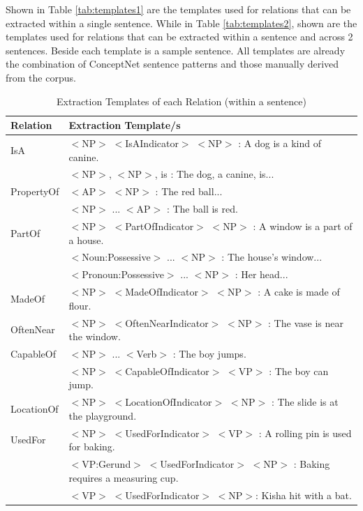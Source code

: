 Shown in Table \ref{tab:templates1} are the templates used for relations that can be extracted within a single sentence. While in Table \ref{tab:templates2}, shown are the templates used for relations that can be extracted within a sentence and across 2 sentences. Beside each template is a sample sentence. All templates are already the combination of ConceptNet sentence patterns and those manually derived from the corpus.

\begin{table}[H]   %
\centering
\caption{Extraction Templates of each Relation (within a sentence)} \vspace{0.25em}
\begin{tabular}{|p{3.5cm}|p{10cm}|} \hline
Relation & Extraction Template/s \\ \hline
IsA					& $<$NP$>$ $<$IsAIndicator$>$ $<$NP$>$ : A dog is a kind of canine. \\
					& $<$NP$>$, $<$NP$>$, is : The dog, a canine, is... \\ \hline
PropertyOf			& $<$AP$>$ $<$NP$>$ : The red ball... \\
					& $<$NP$>$ ... $<$AP$>$ : The ball is red. \\ \hline
PartOf				& $<$NP$>$ $<$PartOfIndicator$>$ $<$NP$>$ : A window is a part of a house. \\
					& $<$Noun:Possessive$>$ ... $<$NP$>$ : The house's window... \\
					& $<$Pronoun:Possessive$>$ ... $<$NP$>$ : Her head... \\ \hline
MadeOf				& $<$NP$>$ $<$MadeOfIndicator$>$ $<$NP$>$ : A cake is made of flour. \\ \hline
OftenNear			& $<$NP$>$ $<$OftenNearIndicator$>$ $<$NP$>$ : The vase is near the window. \\ \hline
CapableOf			& $<$NP$>$ ... $<$Verb$>$ : The boy jumps. \\
					& $<$NP$>$ $<$CapableOfIndicator$>$ $<$VP$>$ : The boy can jump. \\ \hline
LocationOf			& $<$NP$>$ $<$LocationOfIndicator$>$ $<$NP$>$ : The slide is at the playground. \\ \hline
UsedFor				& $<$NP$>$ $<$UsedForIndicator$>$ $<$VP$>$ : A rolling pin is used for baking. \\
					& $<$VP:Gerund$>$ $<$UsedForIndicator$>$ $<$NP$>$ : Baking requires a measuring cup. \\
					& $<$VP$>$ $<$UsedForIndicator$>$ $<$NP$>$: Kisha hit with a bat. \\ \hline

\end{tabular}
\end{table}

